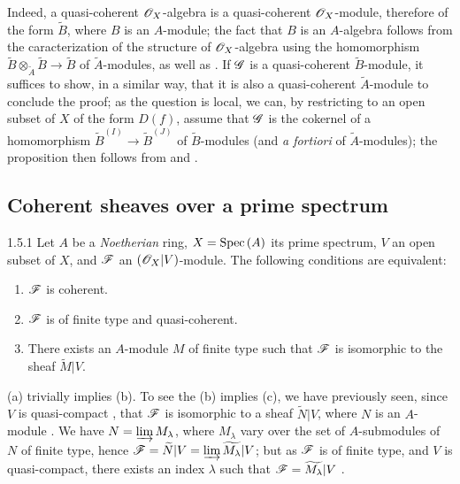 Indeed, a quasi-coherent $\mathscr{O}_X$-algebra is a quasi-coherent $\mathscr{O}_X$-module, therefore of the
form $\widetilde{B}$, where $B$ is an $A$-module; the fact that $B$ is an $A$-algebra
follows from the caracterization of the structure of $\mathscr{O}_X$-algebra using the homomorphism
$\widetilde{B}\otimes_{\widetilde{A}}\widetilde{B}\to\widetilde{B}$ of
$\widetilde{A}$-modules, as well as . If $\mathscr{G}$ is a quasi-coherent
$\widetilde{B}$-module, it suffices to show, in a similar way,
that it is also a quasi-coherent $\widetilde{A}$-module to conclude the proof; as the
question is local, we can, by restricting to an open subset of $X$ of the form $D(f)$, assume
that $\mathscr{G}$ is the cokernel of a homomorphism $\widetilde{B}^{(I)}\to\widetilde{B}^{(J)}$
of $\widetilde{B}$-modules (and \emph{a fortiori} of $\widetilde{A}$-modules); the
proposition then follows from  and .

\subsection{Coherent sheaves over a prime spectrum}
\label{1-schemes-1.5}

\begin{envs}[Theorem]{1.5.1}
\label{thm-1.1.5.1}
Let $A$ be a \emph{Noetherian} ring, $X={\mathop{\mathrm{Spec}}\nolimits}\,(A)$ its prime spectrum, $V$ an open subset of
$X$, and $\mathscr{F}$ an $(\mathscr{O}_X|V)$-module. The following conditions are equivalent:
\begin{enumerate}[label=\rm{(\alph*)}]
  \item $\mathscr{F}$ is coherent.
  \item $\mathscr{F}$ is of finite type and quasi-coherent.
  \item There exists an $A$-module $M$ of finite type such that $\mathscr{F}$ is isomorphic to
        the sheaf $\widetilde{M}|V$.
\end{enumerate}
\end{envs}

(a) trivially implies (b). To see the (b) implies (c), we have previously seen, since $V$
is quasi-compact , that $\mathscr{F}$ is isomorphic to a sheaf $\widetilde{N}|V$,
where $N$ is an $A$-module . We have $N=\varinjlim M_\lambda$, where
$M_\lambda$ vary over the set of $A$-submodules of $N$ of finite type, hence
 $\mathscr{F}=\widetilde{N}|V=\varinjlim\widetilde{M_\lambda}|V$; but as $\mathscr{F}$
is of finite type, and $V$ is quasi-compact, there exists an index $\lambda$ such that
$\mathscr{F}=\widetilde{M_\lambda}|V$ .


